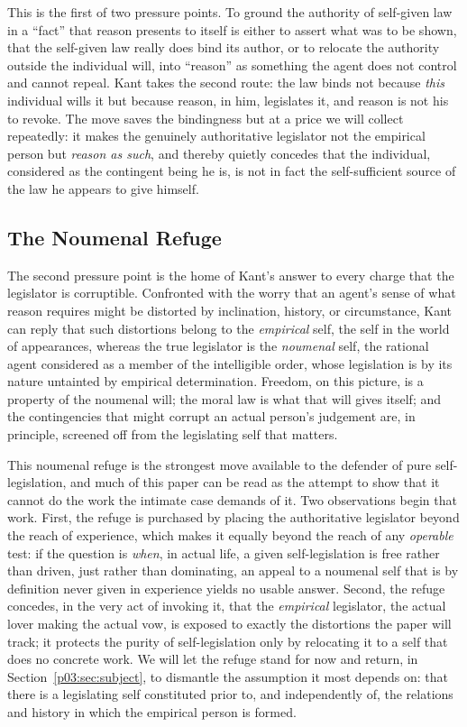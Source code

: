 This is the first of two pressure points. To ground the authority of self-given law in a ``fact'' that reason presents to itself is either to assert what was to be shown, that the self-given law really does bind its author, or to relocate the authority outside the individual will, into ``reason'' as something the agent does not control and cannot repeal. Kant takes the second route: the law binds not because \emph{this} individual wills it but because reason, in him, legislates it, and reason is not his to revoke. The move saves the bindingness but at a price we will collect repeatedly: it makes the genuinely authoritative legislator not the empirical person but \emph{reason as such}, and thereby quietly concedes that the individual, considered as the contingent being he is, is not in fact the self-sufficient source of the law he appears to give himself.

\subsection{The Noumenal Refuge}

The second pressure point is the home of Kant's answer to every charge that the legislator is corruptible. Confronted with the worry that an agent's sense of what reason requires might be distorted by inclination, history, or circumstance, Kant can reply that such distortions belong to the \emph{empirical} self, the self in the world of appearances, whereas the true legislator is the \emph{noumenal} self, the rational agent considered as a member of the intelligible order, whose legislation is by its nature untainted by empirical determination. Freedom, on this picture, is a property of the noumenal will; the moral law is what that will gives itself; and the contingencies that might corrupt an actual person's judgement are, in principle, screened off from the legislating self that matters.

This noumenal refuge is the strongest move available to the defender of pure self-legislation, and much of this paper can be read as the attempt to show that it cannot do the work the intimate case demands of it. Two observations begin that work. First, the refuge is purchased by placing the authoritative legislator beyond the reach of experience, which makes it equally beyond the reach of any \emph{operable} test: if the question is \emph{when}, in actual life, a given self-legislation is free rather than driven, just rather than dominating, an appeal to a noumenal self that is by definition never given in experience yields no usable answer. Second, the refuge concedes, in the very act of invoking it, that the \emph{empirical} legislator, the actual lover making the actual vow, is exposed to exactly the distortions the paper will track; it protects the purity of self-legislation only by relocating it to a self that does no concrete work. We will let the refuge stand for now and return, in Section~\ref{p03:sec:subject}, to dismantle the assumption it most depends on: that there is a legislating self constituted prior to, and independently of, the relations and history in which the empirical person is formed.

